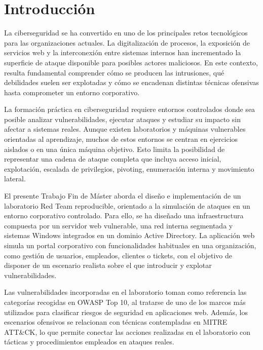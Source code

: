 \vspace*{-0.75cm}


\section{Introducción} %
\label{sec:introduccion}
\vspace{0.7cm}

La ciberseguridad se ha convertido en uno de los principales retos tecnológicos para las organizaciones actuales. La digitalización de procesos, la exposición de servicios web y la interconexión entre sistemas internos han incrementado la superficie de ataque disponible para posibles actores maliciosos. En este contexto, resulta fundamental comprender cómo se producen las intrusiones, qué debilidades suelen ser explotadas y cómo se encadenan distintas técnicas ofensivas hasta comprometer un entorno corporativo.

La formación práctica en ciberseguridad requiere entornos controlados donde sea posible analizar vulnerabilidades, ejecutar ataques y estudiar su impacto sin afectar a sistemas reales. Aunque existen laboratorios y máquinas vulnerables orientadas al aprendizaje, muchos de estos entornos se centran en ejercicios aislados o en una única máquina objetivo. Esto limita la posibilidad de representar una cadena de ataque completa que incluya acceso inicial, explotación, escalada de privilegios, pivoting, enumeración interna y movimiento lateral.

El presente Trabajo Fin de Máster aborda el diseño e implementación de un laboratorio Red Team reproducible, orientado a la simulación de ataques en un entorno corporativo controlado. Para ello, se ha diseñado una infraestructura compuesta por un servidor web vulnerable, una red interna segmentada y sistemas Windows integrados en un dominio Active Directory. La aplicación web simula un portal corporativo con funcionalidades habituales en una organización, como gestión de usuarios, empleados, clientes o tickets, con el objetivo de disponer de un escenario realista sobre el que introducir y explotar vulnerabilidades.

Las vulnerabilidades incorporadas en el laboratorio toman como referencia las categorías recogidas en OWASP Top 10, al tratarse de uno de los marcos más utilizados para clasificar riesgos de seguridad en aplicaciones web. Además, los escenarios ofensivos se relacionan con técnicas contempladas en MITRE ATT\&CK, lo que permite conectar las acciones realizadas en el laboratorio con tácticas y procedimientos empleados en ataques reales.

